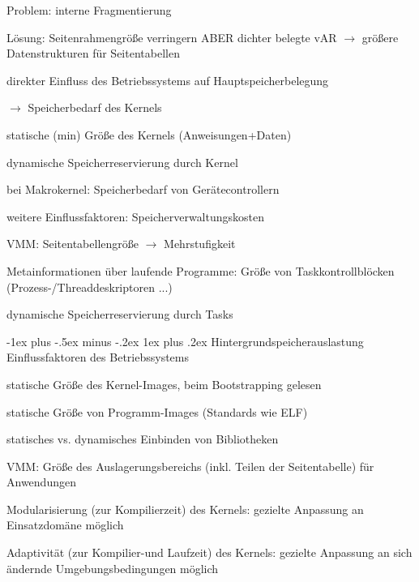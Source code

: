 \documentclass[a4paper]{article}
\makeatletter
\renewcommand{\subsubsection}{\@startsection{subsubsection}{3}{0mm}%
 {-1ex plus -.5ex minus -.2ex}%
 {1ex plus .2ex}%
 {\normalfont\small\bfseries}}
\makeatother
\begin{document}
\begin{multicols}{3}
    Problem: interne Fragmentierung
    \begin{itemize*}
        \item Lösung: Seitenrahmengröße verringern ABER dichter belegte vAR $\rightarrow$ größere Datenstrukturen für Seitentabellen
        \item direkter Einfluss des Betriebssystems auf Hauptspeicherbelegung
        \begin{itemize*}
            \item[$\rightarrow$] Speicherbedarf des Kernels
            \item statische (min) Größe des Kernels (Anweisungen+Daten)
            \item dynamische Speicherreservierung durch Kernel
            \item bei Makrokernel: Speicherbedarf von Gerätecontrollern
        \end{itemize*}
    \end{itemize*}

    weitere Einflussfaktoren: Speicherverwaltungskosten
    \begin{itemize*}
        \item VMM: Seitentabellengröße $\rightarrow$ Mehrstufigkeit
        \item Metainformationen über laufende Programme: Größe von Taskkontrollblöcken (Prozess-/Threaddeskriptoren ...)
        \item dynamische Speicherreservierung durch Tasks
    \end{itemize*}

    \subsubsection{Hintergrundspeicherauslastung}
    Einflussfaktoren des Betriebssystems
    \begin{itemize*}
        \item statische Größe des Kernel-Images, beim Bootstrapping gelesen
        \item statische Größe von Programm-Images (Standards wie ELF)
        \item statisches vs. dynamisches Einbinden von Bibliotheken
        \item VMM: Größe des Auslagerungsbereichs (inkl. Teilen der Seitentabelle) für Anwendungen
        \item Modularisierung (zur Kompilierzeit) des Kernels: gezielte Anpassung an Einsatzdomäne möglich
        \item Adaptivität (zur Kompilier-und Laufzeit) des Kernels: gezielte Anpassung an sich ändernde Umgebungsbedingungen möglich
    \end{itemize*}


\end{multicols}
\end{document}
